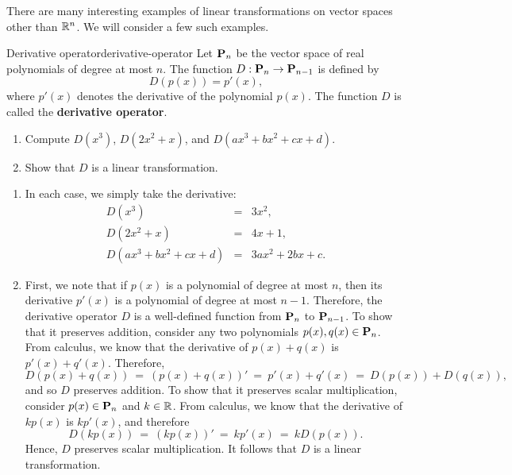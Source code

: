 There are many interesting examples of linear transformations on
vector spaces other than $\mathbb{R}^n$. We will consider a few such examples.

\begin{example}{Derivative operator}{derivative-operator}
  Let $\mathbf{P}_n$ be the vector space of real polynomials of degree at
  most $n$. The function $D:\mathbf{P}_n\to\mathbf{P}_{n-1}$ is defined by
  \begin{equation*}
    D(p(x)) = p'(x),
  \end{equation*}
  where $p'(x)$ denotes the derivative of the polynomial $p(x)$. The
  function $D$ is called the \textbf{derivative operator}.
  \begin{enumialphparenastyle}
    \begin{enumerate}
    \item Compute $D(x^3)$, $D(2x^2+x)$, and $D(ax^3+bx^2+cx+d)$.
    \item Show that $D$ is a linear transformation.
    \end{enumerate}
  \end{enumialphparenastyle}
\end{example}

\begin{solution}
  \begin{enumialphparenastyle}
    \begin{enumerate}
    \item In each case, we simply take the derivative:
      \begin{eqnarray*}
        D(x^3) &=& 3x^2, \\
        D(2x^2+x) &=& 4x+1, \\
        D(ax^3+bx^2+cx+d) &=& 3ax^2 + 2bx + c.
      \end{eqnarray*}
    \item First, we note that if $p(x)$ is a polynomial of degree at
      most $n$, then its derivative $p'(x)$ is a polynomial of degree
      at most $n-1$. Therefore, the derivative operator $D$ is a
      well-defined function from $\mathbf{P}_n$ to $\mathbf{P}_{n-1}$. To show that
      it preserves addition, consider any two polynomials
      $p(x),q(x)\in\mathbf{P}_n$. From calculus, we know that the
      derivative of $p(x)+q(x)$ is $p'(x)+q'(x)$. Therefore,
      \begin{equation*}
        D(p(x)+q(x)) ~=~ (p(x)+q(x))' ~=~ p'(x)+q'(x) ~=~ D(p(x)) + D(q(x)),
      \end{equation*}
      and so $D$ preserves addition. To show that it preserves scalar
      multiplication, consider $p(x)\in\mathbf{P}_n$ and $k\in\mathbb{R}$. From
      calculus, we know that the derivative of $kp(x)$ is $kp'(x)$, and
      therefore
      \begin{equation*}
        D(kp(x)) ~=~ (kp(x))' ~=~ kp'(x) ~=~ kD(p(x)).
      \end{equation*}
      Hence, $D$ preserves scalar multiplication. It follows that $D$ is a
      linear transformation.
    \end{enumerate}
  \end{enumialphparenastyle}
\end{solution}

